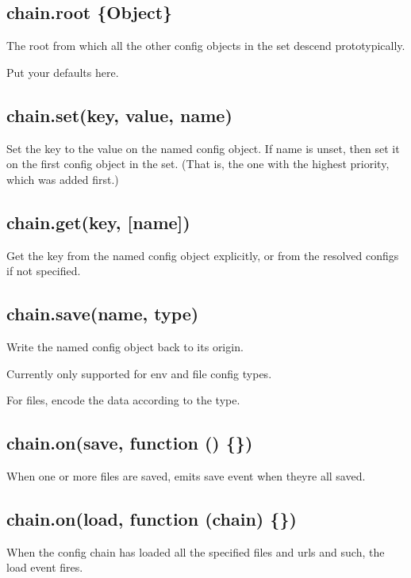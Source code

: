 \subsection*{chain.\+root \{Object\}}

The root from which all the other config objects in the set descend prototypically.

Put your defaults here.

\subsection*{chain.\+set(key, value, name)}

Set the key to the value on the named config object. If name is unset, then set it on the first config object in the set. (That is, the one with the highest priority, which was added first.)

\subsection*{chain.\+get(key, \mbox{[}name\mbox{]})}

Get the key from the named config object explicitly, or from the resolved configs if not specified.

\subsection*{chain.\+save(name, type)}

Write the named config object back to its origin.

Currently only supported for env and file config types.

For files, encode the data according to the type.

\subsection*{chain.\+on(\textquotesingle{}save\textquotesingle{}, function () \{\})}

When one or more files are saved, emits {\ttfamily save} event when they\textquotesingle{}re all saved.

\subsection*{chain.\+on(\textquotesingle{}load\textquotesingle{}, function (chain) \{\})}

When the config chain has loaded all the specified files and urls and such, the \textquotesingle{}load\textquotesingle{} event fires. 